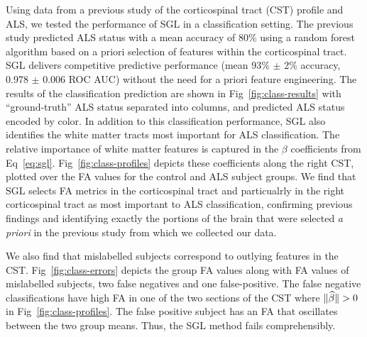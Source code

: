 Using data from a previous study of the corticospinal tract (CST) profile and
ALS\cite{sarica2017corticospinal}, we tested the performance of SGL in a
classification setting. The previous study predicted ALS status with a mean
accuracy of 80\% using a random forest algorithm based on a priori selection of
features within the corticospinal tract. SGL delivers competitive predictive
performance (mean 93\% $\pm$ 2\% accuracy, 0.978 $\pm$ 0.006 ROC AUC) without
the need for a priori feature engineering. The results of the classification
prediction are shown in Fig~\ref{fig:class-results} with ``ground-truth'' ALS
status separated into columns, and predicted ALS status encoded by color. In
addition to this classification performance, SGL also identifies the white
matter tracts most important for ALS classification. The relative importance of
white matter features is captured in the $\beta$ coefficients from
Eq~\eqref{eq:sgl}. Fig~\ref{fig:class-profiles} depicts these coefficients along
the right CST, plotted over the FA values for the control and ALS subject
groups. We find that SGL selects
FA metrics in the corticospinal tract and particualrly in the right
corticospinal tract as most important to ALS classification, confirming previous
findings\cite{van2011upper, toosy2003diffusion, sarica2014tractography,
sage2007quantitative, sage2009quantitative, karlsborg2004corticospinal,
ellis1999diffusion, cosottini2005diffusion, ciccarelli2009investigation,
abe2010voxel} and identifying exactly the portions of the brain that were
selected \emph{a priori} in the previous study from which we collected our
data\cite{sarica2017corticospinal}.

We also find that mislabelled subjects correspond to outlying features in the
CST. Fig~\ref{fig:class-errors} depicts the group FA values along with
FA values of mislabelled subjects, two false negatives and one false-positive.
The false negative classifications have high FA in one of the two sections of
the CST where $\lVert\widehat{\beta}\rVert > 0$ in Fig~\ref{fig:class-profiles}.
The false positive subject has an FA that oscillates between the two group
means. Thus, the SGL method fails comprehensibly.

